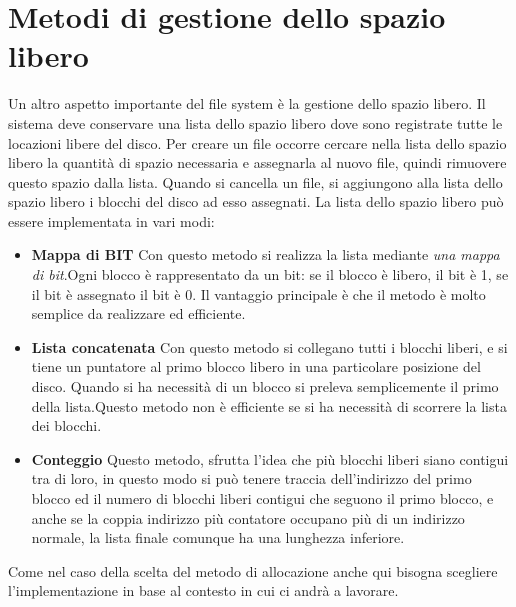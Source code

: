          \section{Metodi di gestione dello spazio libero} 
         Un altro aspetto importante del file system  è la gestione dello spazio libero. Il sistema deve conservare una lista dello spazio libero dove sono registrate tutte le locazioni libere del disco. Per creare un file occorre cercare nella lista dello spazio libero la quantità di spazio necessaria e assegnarla al nuovo file, quindi rimuovere questo spazio dalla lista. Quando si cancella un file, si aggiungono alla lista dello spazio libero i blocchi del disco ad esso assegnati. 
         La lista dello spazio libero può essere implementata in vari modi: 
         \begin{itemize}
          \item \textbf{Mappa di BIT} Con questo metodo si realizza la lista mediante \textit{una mappa di bit}.Ogni blocco è rappresentato da un bit: se il blocco è libero, il bit è 1, se il bit è assegnato il bit è 0. Il vantaggio principale è che il metodo è molto semplice da realizzare ed efficiente.
         \end{itemize}
          \begin{itemize}
           \item \textbf{Lista concatenata} Con questo metodo si collegano tutti i blocchi liberi, e si tiene un puntatore al primo blocco libero in una particolare posizione del disco. Quando si ha necessità di un blocco si preleva  semplicemente il primo della lista.Questo metodo non è efficiente se si ha necessità di scorrere la lista dei blocchi.    
          \end{itemize}
          \begin{itemize}
           \item\textbf{ Conteggio} Questo metodo, sfrutta l'idea che più blocchi liberi siano contigui tra di loro, in questo modo si può tenere traccia dell'indirizzo del primo blocco ed il numero di blocchi liberi contigui che seguono il primo blocco, e anche se la coppia indirizzo più contatore occupano più di un indirizzo normale, la lista finale comunque ha una lunghezza inferiore.
          \end{itemize}
            Come nel caso  della scelta del metodo di allocazione anche qui bisogna scegliere l'implementazione in base al contesto in cui ci andrà a lavorare.
